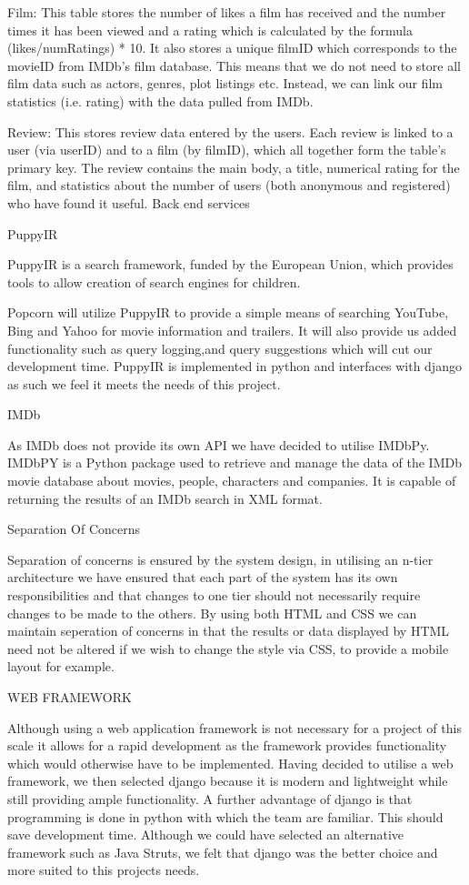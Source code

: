 \documentclass{sig-alt-release2}
\begin{document}
Film: This table stores the number of likes a film has received and the number times it has been viewed and a rating which is calculated by the formula (likes/numRatings) * 10. It also stores a unique filmID which corresponds to the movieID from IMDb's film database. This means that we do not need to store all film data such as actors, genres, plot listings etc. Instead, we can link our film statistics (i.e. rating) with the data pulled from IMDb. 
 
Review: This stores review data entered by the users. Each review is linked to a user (via userID) and to a film (by filmID), which all together form the table's primary key. The review contains the main body, a title, numerical rating for the film, and statistics about the number of users (both anonymous and registered) who have found it useful. 
Back end services 
 
 
PuppyIR 
 
PuppyIR is a search framework, funded by the European Union, which provides tools to allow creation of search engines for children. \cite{puppyir}
 
Popcorn will utilize PuppyIR to provide a simple means of searching YouTube, Bing and Yahoo for movie information and trailers. It will also provide us added functionality such as query logging,and query suggestions which will cut our development time. PuppyIR is implemented in python and interfaces with django as such we feel it meets the needs of this project. 
 
IMDb 
 
As IMDb does not provide its own API we have decided to utilise IMDbPy.  IMDbPY is a Python package used to retrieve and manage the data of the IMDb movie database about movies, people, characters and companies. \cite{imdbpy}
It is capable of returning the results of an IMDb search in XML format. 
 
 
Separation Of Concerns 
 
Separation of concerns is ensured by the system design, in utilising an n-tier architecture we have ensured that each part of the system has its own responsibilities and that changes to one tier should not necessarily require changes to be made to the others. By using both HTML and CSS we can maintain seperation of concerns in that the results or data displayed by HTML need not be altered if we wish to change the style via CSS, to provide a mobile layout for example. 
 
WEB FRAMEWORK 
 
Although using a web application framework is not necessary for a project of this scale it allows for a rapid development as the framework provides functionality which would otherwise have to be implemented.  Having decided to utilise a web framework, we then  selected django because it is modern and lightweight while still providing ample functionality. A further advantage of django is that programming is done in python with which the team are familiar. This should save development time. Although we could have selected an alternative framework such as Java Struts, we felt that django was the better choice and more suited to this projects needs. 
 
\end{document}

